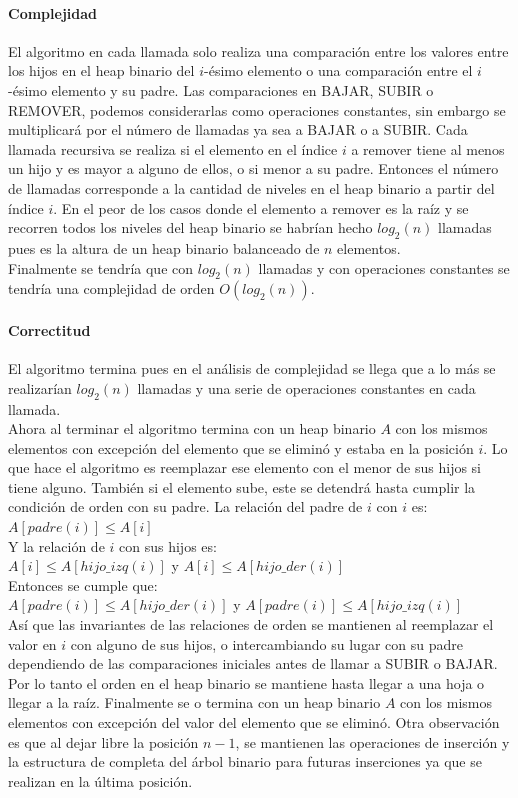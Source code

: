 \documentclass[12pt]{article}
\begin{document}
\paragraph{Complejidad} El algoritmo en cada llamada solo realiza una comparación entre los valores entre los hijos en el heap binario del $i$-ésimo elemento o una comparación entre el $i$-ésimo elemento y su padre. Las comparaciones en BAJAR, SUBIR o REMOVER, podemos considerarlas como operaciones constantes, sin embargo se multiplicará por el número de llamadas ya sea a BAJAR o a SUBIR. Cada llamada recursiva se realiza si el elemento en el índice $i$ a remover tiene al menos un hijo y es mayor a alguno de ellos, o si menor a su padre. Entonces el número de llamadas corresponde a la cantidad de niveles en el heap binario a partir del índice $i$. En el peor de los casos donde el elemento a remover es la raíz y se recorren todos los niveles del heap binario se habrían hecho $log_2(n)$ llamadas pues es la altura de un heap binario balanceado de $n$ elementos.\\ Finalmente se tendría que con $log_2(n)$ llamadas y con operaciones constantes se tendría una complejidad de orden $O(log_2(n))$.
\paragraph{Correctitud} El algoritmo termina pues en el análisis de complejidad se llega que a lo más se realizarían $log_2(n)$ llamadas y una serie de operaciones constantes en cada llamada.\\
Ahora al terminar el algoritmo termina con un heap binario $A$ con los mismos elementos con excepción del elemento que se eliminó y estaba en la posición $i$. Lo que hace el algoritmo es reemplazar ese elemento con el menor de sus hijos si tiene alguno. También si el elemento sube, este se detendrá hasta cumplir la condición de orden con su padre. La relación del padre de $i$ con $i$ es: \\
$A[padre(i)] \leq A[i]$\\
Y la relación de $i$ con sus hijos es:\\
$A[i] \leq A[hijo\_izq(i)]$ y  $A[i] \leq A[hijo\_der(i)]$\\
Entonces se cumple que:\\
$A[padre(i)] \leq A[hijo\_der(i)]$ y $A[padre(i)] \leq A[hijo\_izq(i)]$\\
Así que las invariantes de las  relaciones de orden se mantienen al reemplazar el valor en $i$ con alguno de sus hijos, o intercambiando su lugar con su padre dependiendo de las comparaciones iniciales antes de llamar a SUBIR o BAJAR.
Por lo tanto el orden en el heap binario se mantiene hasta llegar a una hoja o llegar a la raíz. Finalmente se o termina con un heap binario $A$ con los mismos elementos con excepción del valor del elemento que se eliminó.
Otra observación es que al dejar libre la posición $n-1$, se mantienen las operaciones de inserción y la estructura de completa del árbol binario para futuras inserciones ya que se realizan en la última posición.
\pagebreak
\end{document}

